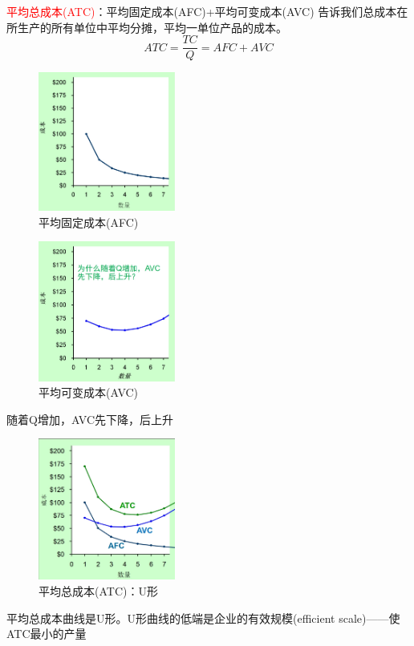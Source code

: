 \documentclass[12pt,a4paper]{article}
\begin{document}
\textcolor{red}{平均总成本(ATC)}：平均固定成本(AFC)+平均可变成本(AVC)
\indent 告诉我们总成本在所生产的所有单位中平均分摊，平均一单位产品的成本。
\[
ATC = \frac{TC}{Q} = AFC + AVC
\]
\begin{figure}[H] 
  \centering %
  \includegraphics[width=0.4\textwidth]{AFC.png} 
  \caption{平均固定成本(AFC)} %
\end{figure}
\begin{figure}[H] 
  \centering %
  \includegraphics[width=0.4\textwidth]{AVC.png} 
  \caption{平均可变成本(AVC)} %
\end{figure}
随着Q增加，AVC先下降，后上升

\begin{figure}[H] 
  \centering %
  \includegraphics[width=0.4\textwidth]{ATC.png} 
  \caption{平均总成本(ATC)：U形} %
\end{figure}
平均总成本曲线是U形。U形曲线的低端是企业的有效规模(efficient scale)——使ATC最小的产量\\
\end{document}
